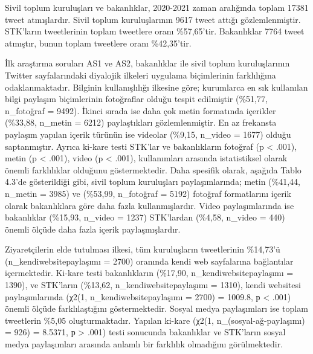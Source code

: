 \documentclass[
]{book}
\begin{document}
Sivil toplum kuruluşları ve bakanlıklar, 2020-2021 zaman aralığında toplam 17381 tweet atmışlardır. Sivil toplum kuruluşlarının 9617 tweet attığı gözlemlenmiştir. STK'ların tweetlerinin toplam tweetlere oranı \%57,65'tir. Bakanlıklar 7764 tweet atmıştır, bunun toplam tweetlere oranı \%42,35'tir.

İlk araştırma soruları AS1 ve AS2, bakanlıklar ile sivil toplum kuruluşlarının Twitter sayfalarındaki diyalojik ilkeleri uygulama biçimlerinin farklılığına odaklanmaktadır.
Bilginin kullanışlılığı ilkesine göre; kurumlarca en sık kullanılan bilgi paylaşım biçimlerinin fotoğraflar olduğu tespit edilmiştir (\%51,77, n\_fotoğraf = 9492). İkinci sırada ise daha çok metin formatında içerikler (\%33,88, n\_metin = 6212) paylaştıkları gözlemlenmiştir. En az frekansta paylaşım yapılan içerik türünün ise videolar (\%9,15, n\_video = 1677) olduğu saptanmıştır. Ayrıca ki-kare testi STK'lar ve bakanlıkların fotoğraf (p \textless{} .001), metin (p \textless{} .001), video (p \textless{} .001), kullanımları arasında istatistiksel olarak önemli farklılıklar olduğunu göstermektedir. Daha spesifik olarak, aşağıda Tablo 4.3'de gösterildiği gibi, sivil toplum kuruluşları paylaşımlarında; metin (\%41,44, n\_metin = 3985) ve (\%53,99, n\_fotoğraf = 5192) fotoğraf formatlarını içerik olarak bakanlıklara göre daha fazla kullanmışlardır. Video paylaşımlarında ise bakanlıklar (\%15,93, n\_video = 1237) STK'lardan (\%4,58, n\_video = 440) önemli ölçüde daha fazla içerik paylaşmışlardır.

Ziyaretçilerin elde tutulması ilkesi, tüm kuruluşların tweetlerinin \%14,73'ü (n\_kendiwebsitepaylaşımı = 2700) oranında kendi web sayfalarına bağlantılar içermektedir. Ki-kare testi bakanlıkların (\%17,90, n\_kendiwebsitepaylaşımı = 1390), ve STK'ların (\%13,62, n\_kendiwebsitepaylaşımı = 1310), kendi websitesi paylaşımlarında (χ2(1, n\_kendiwebsitepaylaşımı = 2700) = 1009.8, р \textless{} .001) önemli ölçüde farklılaştığını göstermektedir. Sosyal medya paylaşımları ise toplam tweetlerin \%5,05 oluşturmaktadır. Yapılan ki-kare (χ2(1, n\_(sosyal-ağ-paylaşımı) = 926) = 8.5371, р \textgreater{} .001) testi sonucunda bakanlıklar ve STK'ların sosyal medya paylaşımları arasında anlamlı bir farklılık olmadığını görülmektedir.
\end{document}

